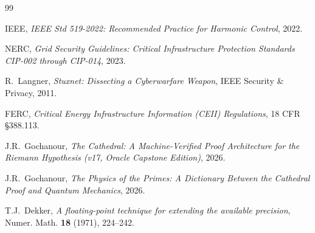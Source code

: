\documentclass[11pt,a4paper]{article}
\begin{document}
\begin{thebibliography}{99}

IEEE, \emph{IEEE Std 519-2022: Recommended Practice for Harmonic
Control}, 2022.

NERC, \emph{Grid Security Guidelines: Critical Infrastructure
Protection Standards CIP-002 through CIP-014}, 2023.

R.~Langner, \emph{Stuxnet: Dissecting a Cyberwarfare Weapon},
IEEE Security \& Privacy, 2011.

FERC, \emph{Critical Energy Infrastructure Information (CEII)
Regulations}, 18 CFR \S 388.113.

J.R.~Gochanour, \emph{The Cathedral: A Machine-Verified Proof
Architecture for the Riemann Hypothesis (v17, Oracle
Capstone Edition)}, 2026.

J.R.~Gochanour, \emph{The Physics of the Primes: A Dictionary
Between the Cathedral Proof and Quantum Mechanics}, 2026.

T.J.~Dekker, \emph{A floating-point technique for extending the
available precision}, Numer. Math. \textbf{18} (1971), 224--242.

\end{thebibliography}
\end{document}
